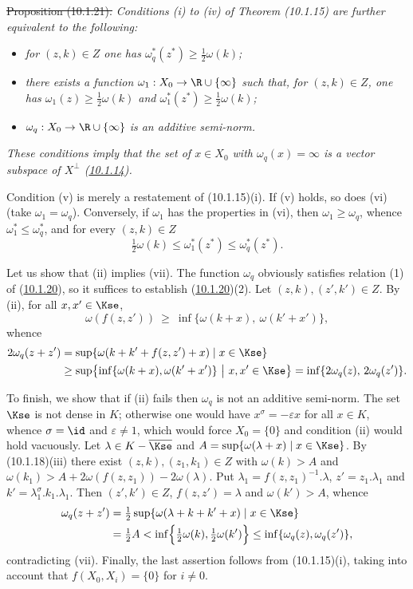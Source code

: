 \documentclass[12pt,a4paper,oneside,english]{smfart}
\newcommand{\btref}[1]{\hyperlink{bt:#1}{#1}}
\theoremstyle{definition}
\theoremstyle{bt}
\begin{document}
\st{Proposition (10.1.21).}
\emph{Conditions (i) to (iv) of Theorem (10.1.15) are further equivalent to the
following:}
\begin{itemize}
\item[(v)] \emph{for $(z,k)\in Z$ one has
$\omega_q^{*}(z^{*})\ge\tfrac12\omega(k)$;}
\item[(vi)] \emph{there exists a function $\omega_1:X_0\to\R\cup\{\infty\}$
such that, for $(z,k)\in Z$, one has $\omega_1(z)\ge\tfrac12\omega(k)$ and
$\omega_1^{*}(z^{*})\ge\tfrac12\omega(k)$;}
\item[(vii)] \emph{$\omega_q:X_0\to\R\cup\{\infty\}$ is an additive
semi-norm.}
\end{itemize}
\emph{These conditions imply that the set of $x\in X_0$ with
$\omega_q(x)=\infty$ is a vector subspace of $X^{\perp}$ (\btref{10.1.14}).}

\pf Condition (v) is merely a restatement of (10.1.15)(i). If (v) holds, so does
(vi) (take $\omega_1=\omega_q$). Conversely, if $\omega_1$ has the properties in
(vi), then $\omega_1\ge\omega_q$, whence $\omega_1^{*}\le\omega_q^{*}$, and for
every $(z,k)\in Z$
\[
\tfrac12\omega(k)\le\omega_1^{*}(z^{*})\le\omega_q^{*}(z^{*}).
\]

Let us show that (ii) implies (vii). The function $\omega_q$ obviously satisfies
relation (1) of (\btref{10.1.20}), so it suffices to establish (\btref{10.1.20})(2). Let
$(z,k),(z',k')\in Z$. By (ii), for all $x,x'\in\Kse$,
\[
\omega(f(z,z'))\ \ge\ \inf\{\omega(k+x),\ \omega(k'+x')\},
\]
whence
\begin{align*}
2\omega_q(z+z')
 &=\sup\{\omega(k+k'+f(z,z')+x)\mid x\in\Kse\}\\
 &\ge\sup\bigl\{\inf\{\omega(k+x),\omega(k'+x')\}\ \big|\ x,x'\in\Kse\bigr\}
   =\inf\{2\omega_q(z),\,2\omega_q(z')\}.
\end{align*}

To finish, we show that if (ii) fails then $\omega_q$ is not an additive
semi-norm. The set $\Kse$ is not dense in $K$; otherwise one would have
$x^{\sigma}=-\varepsilon x$ for all $x\in K$, whence $\sigma=\id$ and
$\varepsilon\neq1$, which would force $X_0=\{0\}$ and condition (ii) would hold
vacuously. Let $\lambda\in K-\overline{\Kse}$ and
$A=\sup\{\omega(\lambda+x)\mid x\in\Kse\}$. By (10.1.18)(iii) there exist
$(z,k),(z_1,k_1)\in Z$ with $\omega(k)>A$ and
$\omega(k_1)>A+2\omega(f(z,z_1))-2\omega(\lambda)$. Put
$\lambda_1=f(z,z_1)^{-1}.\lambda$, $z'=z_1.\lambda_1$ and
$k'=\lambda_1^{\sigma}.k_1.\lambda_1$. Then $(z',k')\in Z$,
$f(z,z')=\lambda$ and $\omega(k')>A$, whence
\begin{align*}
\omega_q(z+z')&=\tfrac12\sup\{\omega(\lambda+k+k'+x)\mid x\in\Kse\}\\
&=\tfrac12 A<\inf\Bigl\{\tfrac12\omega(k),\tfrac12\omega(k')\Bigr\}
\le\inf\{\omega_q(z),\omega_q(z')\},
\end{align*}
contradicting (vii). Finally, the last assertion follows from (10.1.15)(i),
taking into account that $f(X_0,X_i)=\{0\}$ for $i\neq0$.
\end{document}
